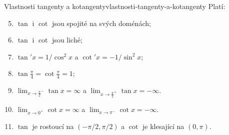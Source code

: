 \begin{proposition}{Vlastnosti tangenty a kotangenty}{vlastnosti-tangenty-a-kotangenty}
 Platí:
 \begin{enumerate}[label=(G\arabic*)]
  \setcounter{enumi}{4}
  \item $\tan$ i $\cot$ jsou spojité na svých doménách;
  \item $\tan$ i $\cot$ jsou liché;
  \item $\tan'x = 1 / \cos^2 x$ a $\cot'x = - 1 / \sin^2 x$;
  \item $\tan \frac{\pi}{4} = \cot \frac{\pi}{4} = 1$;
  \item $\lim_{x \to \frac{\pi}{2}^{-}} \tan x = \infty$ a $\lim_{x \to
   \frac{\pi}{2}^{+}} \tan x = -\infty$.
  \item $\lim_{x \to 0^{+}} \cot x = \infty$ a $\lim_{x \to \pi^{-}} \cot x =
   -\infty$.
  \item $\tan$ je rostoucí na $(-\pi / 2, \pi / 2)$ a $\cot$ je klesající na
   $(0,\pi)$.
 \end{enumerate}
\end{proposition}
